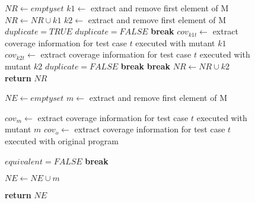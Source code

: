 \begin{figure}[tb]
\begin{algorithmic}[1]
\State $\mathit{NR} \gets \mathit{empty} \mathit{set}$
\State $\mathit{k1} \gets $ extract and remove first element of M
\State $\mathit{NR} \gets \mathit{NR} \cup \mathit{k1}$
\State $\mathit{k2} \gets $ extract and remove first element of M
\State $\mathit{duplicate}=\mathit{TRUE}$
\State $\mathit{duplicate}=\mathit{FALSE}$
\State \textbf{break}
\Else
\State $\mathit{cov}_{k1t} \gets $ extract coverage information for test case $t$ executed with mutant $k1$
\State $\mathit{cov}_{\mathit{k2}t} \gets $ extract coverage information for test case $t$ executed with mutant $k2$
\State $\mathit{duplicate}=\mathit{FALSE}$
\State \textbf{break}
\EndIf
\EndIf
\EndFor
{}
\State \textbf{break} 
\EndIf
\EndFor
{}
\State $\mathit{NR} \gets \mathit{NR} \cup \mathit{k2}$
\EndIf
\EndWhile
\State \textbf{return} $\mathit{NR}$
\EndProcedure


\State $\mathit{NE} \gets \mathit{empty} \mathit{set}$
\State $\mathit{m} \gets $ extract and remove first element of M

\State $\mathit{cov}_{m} \gets $ extract coverage information for test case $t$ executed with mutant $m$
\State $\mathit{cov}_{o} \gets $ extract coverage information for test case $t$ executed with original program

\State $\mathit{equivalent}=\mathit{FALSE}$
\State \textbf{break}
\EndIf

\EndFor

\State $\mathit{NE} \gets \mathit{NE} \cup \mathit{m}$
\EndIf

\EndWhile

\State \textbf{return} $\mathit{NE}$
\EndProcedure




\end{algorithmic}
\end{figure}
